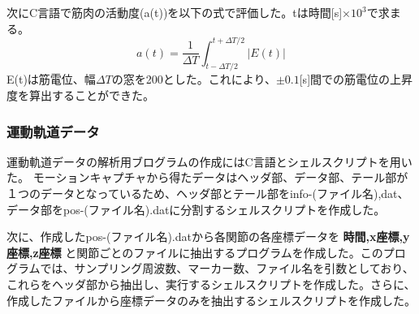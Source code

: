 \documentclass{jsarticle}
\begin{document}
次にC言語で筋肉の活動度(a(t))を以下の式で評価した。tは時間[s]×$10^3$で求まる。
\begin{equation}
a(t)=\frac{1}{\Delta{T}}\int^{t+\Delta{T}/2}_{t-\Delta{T}/2} |E(t)|
\end{equation}
E(t)は筋電位、幅$\Delta{T}$の窓を200とした。これにより、$\pm0.1$[s]間での筋電位の上昇度を算出することができた。

\subsubsection{運動軌道データ}
運動軌道データの解析用ブログラムの作成にはC言語とシェルスクリプトを用いた。
モーションキャプチャから得たデータはヘッダ部、データ部、テール部が１つのデータとなっているため、ヘッダ部とテール部をinfo-(ファイル名),dat、データ部をpos-(ファイル名).datに分割するシェルスクリプトを作成した。

次に、作成したpos-(ファイル名).datから各関節の各座標データを \textbf{時間,x座標,y座標,z座標} と関節ごとのファイルに抽出するプログラムを作成した。このプログラムでは、サンプリング周波数、マーカー数、ファイル名を引数としており、これらをヘッダ部から抽出し、実行するシェルスクリプトを作成した。さらに、作成したファイルから座標データのみを抽出するシェルスクリプトを作成した。
\end{document}
